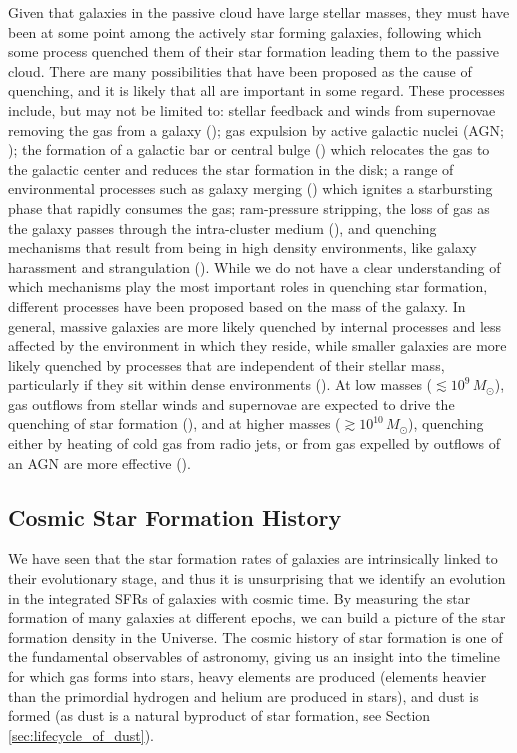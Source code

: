 Given that galaxies in the passive cloud have large stellar masses, they must have been at some point among the actively star forming galaxies, following which some process quenched them of their star formation leading them to the passive cloud. There are many possibilities that have been proposed as the cause of quenching, and it is likely that all are important in some regard. These processes include, but may not be limited to: stellar feedback and winds from supernovae removing the gas from a galaxy (\citealt{Hayward_2017}); gas expulsion by active galactic nuclei (AGN; \citealt{Springel_2005, Croton_2006, Cicone_2014, Harrison_2017}); the formation of a galactic bar or central bulge (\citealt{Bournaud_2007, Martig_2009}) which relocates the gas to the galactic center and reduces the star formation in the disk; a range of environmental processes such as galaxy merging (\citealt{Lavery_1994, Weigel_2017}) which ignites a starbursting phase that rapidly consumes the gas; ram-pressure stripping, the loss of gas as the galaxy passes through the intra-cluster medium (\citealt{Gunn_1972, Boselli_2006, Domainko_2006, Boselli_2014}), and quenching mechanisms that result from being in high density environments, like galaxy harassment and strangulation (\citealt{Moore_1996, Moore_1998, Bekki_2002}). While we do not have a clear understanding of which mechanisms play the most important roles in quenching star formation, different processes have been proposed based on the mass of the galaxy. In general, massive galaxies are more likely quenched by internal processes and less affected by the environment in which they reside, while smaller galaxies are more likely quenched by processes that are independent of their stellar mass, particularly if they sit within dense environments (\citealt{Contini_2019}). At low masses ($\lesssim 10^9\,M_\odot$), gas outflows from stellar winds and supernovae are expected to drive the quenching of star formation (\citealt{Dekel_1986, DallaVecchia_2008}), and at higher masses ($\gtrsim 10^{10}\,M_\odot$), quenching either by heating of cold gas from radio jets, or from gas expelled by outflows of an AGN are more effective (\citealt{Croton_2006, Fabian_2012, Fang_2013, Cicone_2014}).

\subsection{Cosmic Star Formation History}
\label{sec:cosmic_star_formation_history}

We have seen that the star formation rates of galaxies are intrinsically linked to their evolutionary stage, and thus it is unsurprising that we identify an evolution in the integrated SFRs of galaxies with cosmic time. By measuring the star formation of many galaxies at different epochs, we can build a picture of the star formation density in the Universe. The cosmic history of star formation is one of the fundamental observables of astronomy, giving us an insight into the timeline for which gas forms into stars, heavy elements are produced (elements heavier than the primordial hydrogen and helium are produced in stars), and dust is formed (as dust is a natural byproduct of star formation, see Section \ref{sec:lifecycle_of_dust}).

